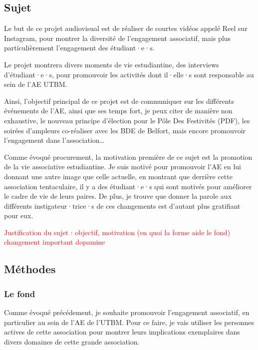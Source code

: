 
\subsection{Sujet}\label{subsec:sujet}

Le but de ce projet audiovisual est de réaliser de courtes vidéos appelé Reel sur Instagram, pour montrer la diversité de l'engagement associatif, mais plus particulièrement l'engagement des étudiant·e·s.

Le projet montrera divers moments de vie estudiantine, des interviews d'étudiant·e·s, pour promouvoir les activités dont il·elle·s sont responsable au sein de l'\gls{AE} \gls{UTBM}.

Ainsi, l'objectif principal de ce projet est de communiquer sur les différents événements de l'\gls{AE}, ainsi que ses temps fort, je peux citer de manière non exhaustive, le nouveau principe d'élection pour le Pôle Des Festivités (PDF), les soirées d'ampleurs co-réaliser avec les BDE de Belfort, mais encore promouvoir l'engagement dans l'association\ldots

Comme évoqué procurement, la motivation première de ce sujet est la promotion de la vie associative estudiantine.
Je suis motivé pour promouvoir l'\gls{AE} en lui donnant une autre image que celle actuelle, en montrant que derrière cette association tentaculaire, il y a des étudiant·e·s qui sont motivés pour améliorer le cadre de vie de leurs paires.
De plus, je trouve que donner la parole aux différents instigateur·trice·s de ces changements est d'autant plus gratifiant pour eux.

\textcolor{red}{Justification du sujet : objectif, motivation (en quoi la forme aide le fond) changement important dopamine}


\subsection{Méthodes}\label{subsec:methodes}


\subsubsection{Le fond}

Comme évoqué précédement, je souhaite promouvoir l'engagement associatif, en particulier au sein de l'\gls{AE} de l'\gls{UTBM}.
Pour ce faire, je vais utiliser les personnes actives de cette association pour montrer leurs implications exemplaires dans divers domaines de cette grande association.

